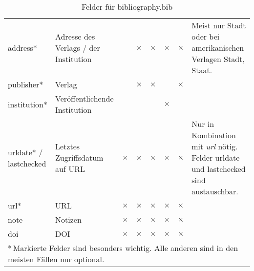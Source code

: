 \begin{table}[ht!]
{\begin{tabular}{l|p{3.5cm}|c|c|c|c|c|p{5.5cm}}
			address* & Adresse des Verlags / der Institution & & $\times$ & $\times$ & $\times$ & $\times$ & Meist nur Stadt oder bei amerikanischen Verlagen Stadt, Staat. \\
			publisher* & Verlag & & $\times$ & $\times$ & & $\times$ & \\
			institution* & Veröffentlichende Institution & & & & $\times$ & & \\
			\makecell[tl]{urldate* / \\ lastchecked} & Letztes Zugriffsdatum auf URL & $\times$ & $\times$ & $\times$ & $\times$ & $\times$ & Nur in Kombination mit \emph{url} nötig. Felder urldate und lastchecked sind austauschbar. \\
			url* & URL & $\times$ & $\times$ & $\times$ & $\times$ & $\times$ & \\
			note & Notizen & $\times$ & $\times$ & $\times$ & $\times$ & $\times$ & \\
			doi & DOI & $\times$ & $\times$ & $\times$ & $\times$ & $\times$ & \\
			\multicolumn{8}{l}{\rule{0pt}{4ex}*\,Markierte Felder sind besonders wichtig. Alle anderen sind in den meisten Fällen nur optional.}
		\end{tabular}
	}
	\caption{Felder für bibliography.bib}
	\label{tab:bibentries}
\end{table}